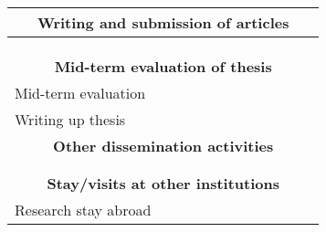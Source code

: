 \begin{tabularx}{\textwidth}{|X|c|c|c|c|c|c|c|c|c|c|c|}
    \multicolumn{12}{|c|}{\textbf{Writing and submission of articles}} \\
    \hline
    & & & & & & & & & & & \\
    \hline
    & & & & & & & & & & & \\
    \hline
    & & & & & & & & & & & \\
    \hline

    \multicolumn{12}{|c|}{\textbf{Mid-term evaluation of thesis}} \\
    \hline
    Mid-term evaluation & & & & & & & & & & & \\
    \hline
    Writing up thesis & & & & & & & & & & & \\
    \hline

    \multicolumn{12}{|c|}{\textbf{Other dissemination activities}} \\
    \hline
    & & & & & & & & & & & \\
    \hline
    & & & & & & & & & & & \\
    \hline

    \multicolumn{12}{|c|}{\textbf{Stay/visits at other institutions}} \\
    \hline
    Research stay abroad & & & & & & & & & & & \\
    \hline


\end{tabularx}